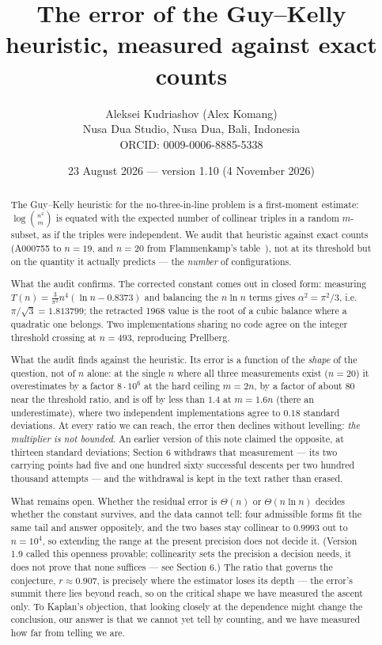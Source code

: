 \documentclass[11pt,a4paper]{article}
\title{The error of the Guy--Kelly heuristic, measured against exact counts}
\author{Aleksei Kudriashov (Alex Komang)\\ \small Nusa Dua Studio, Nusa Dua, Bali, Indonesia\\ \small ORCID: 0009-0006-8885-5338}
\date{23 August 2026 --- version 1.10 (4 November 2026)}
\begin{document}
\maketitle
\begin{abstract}
The Guy--Kelly heuristic for the no-three-in-line problem is a first-moment estimate:
$\log\binom{n^2}{m}$ is equated with the expected number of collinear triples in a random
$m$-subset, as if the triples were independent.  We audit that heuristic against exact counts
(A000755 to $n=19$, and $n=20$ from Flammenkamp's table~\cite{Flammenkamp}), not at its threshold
but on the quantity it actually predicts --- the \emph{number} of configurations.

What the audit confirms.  The corrected constant comes out in closed form: measuring
$T(n)=\tfrac{3}{\pi^2}n^4(\ln n-0.8373)$ and balancing the $n\ln n$ terms gives
$\alpha^2=\pi^2/3$, i.e.\ $\pi/\sqrt3=1.813799$; the retracted 1968 value is the root of a cubic
balance where a quadratic one belongs.  Two implementations sharing no code agree on the integer
threshold crossing at $n=493$, reproducing Prellberg.

What the audit finds against the heuristic.  Its error is a function of the \emph{shape} of the
question, not of $n$ alone: at the single $n$ where all three measurements exist ($n=20$) it
overestimates by a factor $8\cdot10^{6}$ at the hard ceiling $m=2n$, by a factor of about $80$
near the threshold ratio, and is off by less than $1.4$ at $m=1.6n$ (there an underestimate),
where two independent implementations agree to $0.18$ standard deviations.  At every ratio we can
reach, the error then declines without levelling: \emph{the multiplier is not bounded}.  An
earlier version of this note claimed the opposite, at thirteen standard deviations; Section 6
withdraws that measurement --- its two carrying points had five and one hundred sixty successful
descents per two hundred thousand attempts --- and the withdrawal is kept in the text rather than
erased.

What remains open.  Whether the residual error is $\Theta(n)$ or
$\Theta(n\ln n)$ decides whether the constant survives, and the data cannot tell: four admissible
forms fit the same tail and answer oppositely, and the two bases stay collinear to $0.9993$ out
to $n=10^4$, so extending the range at the present precision does not decide it.  (Version 1.9
called this openness provable; collinearity sets the precision a decision needs, it does not prove
that none suffices --- see Section 6.)  The ratio that governs the
conjecture, $r\approx0.907$, is precisely where the estimator loses its depth --- the error's
summit there lies beyond reach, so on the critical shape we have measured the ascent only.  To
Kaplan's objection, that looking closely at the dependence might change the conclusion, our
answer is that we cannot yet tell by counting, and we have measured how far from telling we are.
\end{abstract}
\end{document}
